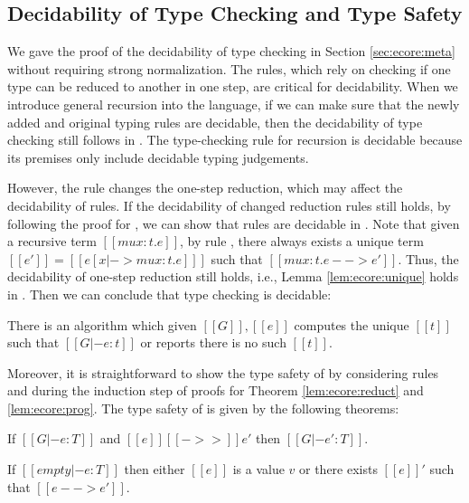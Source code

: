 \subsection{Decidability of Type Checking and Type Safety}\label{sec:rec:meta}
We gave the proof of the decidability of type checking \ecore in
Section \ref{sec:ecore:meta} without requiring strong normalization. The
\cast rules, which rely on checking if
one type can be reduced to another in one step, are critical for decidability. When we introduce
general recursion into the language, if we can make sure that the newly
added and original typing rules are decidable, then the decidability
of type checking still follows in \name.
The type-checking rule  for 
recursion is decidable because its premises only include
decidable typing judgements. 

However, the rule  changes
the one-step reduction, which may affect the decidability of \cast
rules. If the decidability of changed reduction rules still holds, by
following the proof for \ecore, we can show that \cast
rules are decidable in \name. Note that given a recursive term
$[[mu x:t.e]]$, by rule , there always exists a unique
term $[[e']]=[[e[x|->mu x:t.e] ]]$ such that $[[mu x:t.e -->
    e']]$. Thus, the decidability of one-step reduction still holds,
i.e., Lemma \ref{lem:ecore:unique} holds in \name. Then we can conclude that 
type checking \name is decidable:

\begin{thm}\label{lem:rec:decide}
	There is an algorithm which given $[[G]], [[e]]$ computes the
        unique $[[t]]$ such that $[[G |- e:t]]$ or reports there is no
        such $[[t]]$.
\end{thm}

Moreover, it is straightforward to show the type safety of \name by
considering rules  and  during the
induction step of proofs for Theorem \ref{lem:ecore:reduct} and
\ref{lem:ecore:prog}. The type safety of \name is given by
the following theorems:

\begin{thm}\label{lem:rec:reduct}
If $[[G |- e:T]]$ and $[[e]] [[->>]] e'$ then $[[G |- e':T]]$.
\end{thm}

\begin{thm}\label{lem:rec:prog}
If $[[empty |- e:T]]$ then either $[[e]]$ is a value $v$ or there
exists $[[e]]'$ such that $[[e --> e']]$.
\end{thm}
